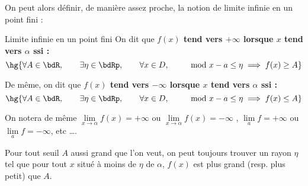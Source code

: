 \documentclass[a4paper,french,bookmarks]{article}
\begin{document}
\begin{enumerate}
{        On peut alors définir, de manière assez proche, la notion de limite infinie en un point fini :
        
        \begin{definition*}{Limite infinie en un point fini}{}
            On dit que \bf{$f(x)$ tend vers $+\infty$ lorsque $x$ tend vers $\alpha$} ssi :
            \[ \hg{\forall A \in \bdR,\qquad \exists \eta \in \bdRp,\qquad \forall x \in D,\qquad \mod{x - a} \leq \eta \implies f(x) \geq A} \]
            
            De même, on dit que \bf{$f(x)$ tend vers $-\infty$ lorsque $x$ tend vers $\alpha$} ssi :
            \[ \hg{\forall A \in \bdR,\qquad \exists \eta \in \bdRp,\qquad \forall x \in D,\qquad \mod{x - a} \leq \eta \implies f(x) \leq A} \]
        \end{definition*}
        
        On notera de même $\lim\limits_{x \to \alpha} f(x) = +\infty$ ou $\lim\limits_{x \to \alpha} f(x) = -\infty$ , $\lim\limits_a f = +\infty$ ou $\lim\limits_a f = -\infty$, etc \dots.
        
        \begin{minipage}{0.2\textwidth}
            Pour tout seuil $A$ aussi grand que l'on veut, on peut toujours trouver un rayon $\eta$ tel que pour tout $x$ situé à moins de $\eta$ de $\alpha$, $f(x)$ est plus grand (resp. plus petit) que $A$.
        \end{minipage}
        \begin{minipage}{0.4\textwidth}
            \centering
            \pgfplotsset{width=\textwidth}
\end{minipage}}
\end{enumerate}
\end{document}
